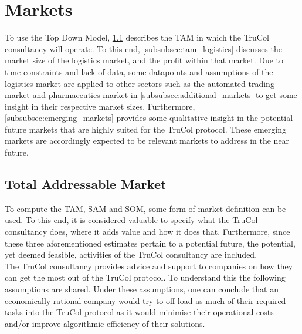 \section{Markets}\label{sec:markets}


To use the Top Down Model, \cref{subsec:total_addressable_market} describes the TAM in which the TruCol consultancy will operate. To this end, \cref{subsubsec:tam_logistics} discusses the market size of the logistics market, and the profit within that market. Due to time-constraints and lack of data, some datapoints and assumptions of the logistics market are applied to other sectors such as the automated trading market and pharmaceutics market in \cref{subsubsec:additional_markets} to get some insight in their respective market sizes. Furthermore, \cref{subsubsec:emerging_markets} provides some qualitative insight in the potential future markets that are highly suited for the TruCol protocol. These emerging markets are accordingly expected to be relevant markets to address in the near future. 

\subsection{Total Addressable Market}\label{subsec:total_addressable_market}
To compute the TAM, SAM and SOM, some form of market definition can be used. To this end, it is considered valuable to specify what the TruCol consultancy does, where it adds value and how it does that. Furthermore, since these three aforementioned estimates pertain to a potential future, the potential, yet deemed feasible, activities of the TruCol consultancy are included.
\\
The TruCol consultancy provides advice and support to companies on how they can get the most out of the TruCol protocol. To understand this the following assumptions are shared. Under these assumptions, one can conclude that an economically rational company would try to off-load as much of their required tasks into the TruCol protocol as it would minimise their operational costs and/or improve algorithmic efficiency of their solutions. 

